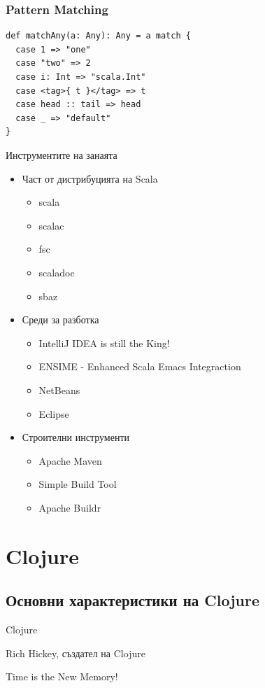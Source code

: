 \documentclass[compress,red]{beamer}
\begin{document}
\begin{frame}[fragile]
  \frametitle{Pattern Matching}
  \transdissolve
\begin{lstlisting}
def matchAny(a: Any): Any = a match {
  case 1 => "one"
  case "two" => 2
  case i: Int => "scala.Int"
  case <tag>{ t }</tag> => t
  case head :: tail => head
  case _ => "default"
}
\end{lstlisting}
\end{frame}

\begin{frame}{Инструментите на занаята}
  \transdissolve
  \begin{itemize}
    \item Част от дистрибуцията на Scala
  \begin{itemize}
  \item scala
  \item scalac
  \item fsc
  \item scaladoc
  \item sbaz
  \end{itemize}
    \item Среди за разботка
      \begin{itemize}
      \item IntelliJ IDEA is still the King!
      \item ENSIME - Enhanced Scala Emacs Integraction
      \item NetBeans
      \item Eclipse
      \end{itemize}
  \item Строителни инструменти
    \begin{itemize}
      \item Apache Maven
      \item Simple Build Tool
      \item Apache Buildr
    \end{itemize}
  \end{itemize}
\end{frame}

\section{Clojure}
\subsection{Основни характеристики на Clojure}

\begin{frame}{Clojure}
  \transdissolve
  \begin{center}
    \begin{block}{Rich Hickey, създател на Clojure} 
      \begin{center}
        Time is the New Memory!
      \end{center}
    \end{block}
  \end{center}
\end{frame}
\end{document}
